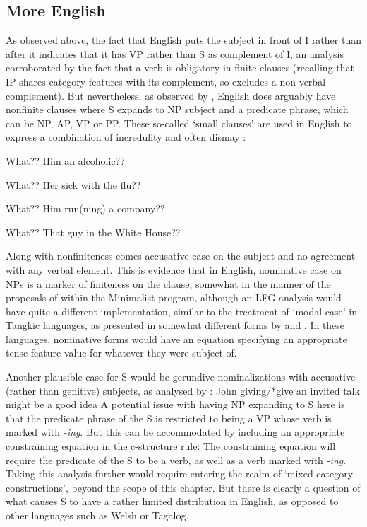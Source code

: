 \documentclass[output=paper,hidelinks]{langscibook}
\begin{document}
\subsection{More English}
As observed above, the fact that English puts the subject in front of I
rather than after it indicates that it has VP rather than S as complement
of I, an analysis corroborated by the fact that a verb is obligatory in finite
clauses (recalling that IP shares category features with its complement, so excludes
a non-verbal complement).  But nevertheless, as observed by \citet{ChungMcCloskey1987},
English does arguably have
nonfinite clauses where S expands to NP subject and a predicate phrase, which
can be NP, AP, VP or PP.
These so-called `small clauses' are used
in English to express a combination of incredulity and often
dismay \citep{Akmajian:Mad}:
\ea\label{esc}
\begin{xlist}
\item What?? Him an alcoholic?? 
\item What?? Her sick with the flu??
\item What?? Him run(ning) a company??
\item What?? That guy in the White House??
\end{xlist}
\z
Along with nonfiniteness comes accusative case on the subject and
no agreement with any verbal element.  This is evidence that in English,
nominative case on NPs is a marker of finiteness on the clause, somewhat
in the manner of the proposals of \citet{PesetskyTorrego2007} within the Minimalist
program, although an LFG analysis would have quite a different implementation,
similar to the treatment of `modal case' in Tangkic languages, as presented
in somewhat different forms by \citet{Andrews1996} and \citet{nordlinger1998constructive}.  In these languages, nominative forms would have an equation specifying an appropriate tense
feature value for whatever they were subject of.  

Another plausible case for S would be gerundive nominalizations with accusative
(rather than genitive) subjects, as analysed by \citet{schachter76}:
\newpage
\ea
John giving/*give an invited talk might be a good idea
\z
A potential issue with having NP expanding to S here is that the predicate phrase
of the S is restricted to being a VP whose verb is marked with {\it -ing}.
But this can be accommodated by including an appropriate constraining equation
in the c-structure rule:
\ea
{}
\z
The constraining equation will require the predicate of the S to be a verb, as
well as a verb marked with {\it -ing}. Taking this analysis further would require
entering the realm of `mixed category constructions', beyond the scope of this chapter.
But there is clearly a question of what causes S to have a rather limited distribution
in English, as opposed to other languages such as Welsh or Tagalog.
\end{document}
